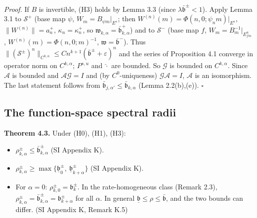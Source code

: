 \documentclass[11pt,a4paper]{article}
\theoremstyle{plain}
\theoremstyle{definition}
\theoremstyle{remark}
\numberwithin{equation}{section}
\numberwithin{figure}{section}
\begin{document}
\textit{Proof.} If $B$ is invertible, (H3) holds by Lemma 3.3 (since $\lambda\bar{\mathfrak b}^\pm<1$). Apply Lemma 3.1 to $\mathcal S^+$ (base map $\psi$, $W_m=B_{\psi m}|_{E^s}$; then $W^{(n)}(m)=\Phi(n,0;\psi_nm)|_{E^s}$, $\|W^{(n)}\|=a^+_n$, $\kappa_n=\kappa^+_n$, so $\mathfrak w_{k,\alpha}=\bar{\mathfrak b}^+_{k,\alpha}$) and to $\mathcal S^-$ (base map $f$, $W_m=B_m^{-1}|_{E^u_{fm}}$, $W^{(n)}(m)=\Phi(n,0;m)^{-1}$, $\mathfrak w=\bar{\mathfrak b}^-$). Thus $\|(\mathcal S^\pm)^n\|_{C^{k,\alpha}}\le Cn^{k+1}(\bar{\mathfrak b}^\pm+\varepsilon)^n$ and the series of Proposition 4.1 converge in operator norm on $C^{k,\alpha}$; $P^{s,u}$ and $\hat\cdot$ are bounded. So $\mathcal G$ is bounded on $C^{k,\alpha}$. Since $\mathcal A$ is bounded and $\mathcal A\mathcal G=I$ and (by $C^0$-uniqueness) $\mathcal G\mathcal A=I$, $\mathcal A$ is an isomorphism. The last statement follows from $\bar{\mathfrak b}_{j,\alpha'}\le\bar{\mathfrak b}_{k,\alpha}$ (Lemma 2.2(b),(e)). $\square$

\subsection{The function-space spectral radii}

\textbf{Theorem 4.3.} Under (H0), (H1), (H3):
\begin{itemize}
    \item[(a)] $\rho^\pm_{k,\alpha}\le\bar{\mathfrak b}^\pm_{k,\alpha}$ (SI Appendix K).
    \item[(b)] $\rho^\pm_{k,\alpha}\ge\max\{\underline{\mathfrak b}^\pm_0,\ \underline{\mathfrak b}^\pm_{k+\alpha}\}$ (SI Appendix K).
    \item[(c)] For $\alpha=0$: $\rho^\pm_{k,0}=\mathfrak b^\pm_k$. In the rate-homogeneous class (Remark 2.3), $\rho^\pm_{k,\alpha}=\bar{\mathfrak b}^\pm_{k,\alpha}=\mathfrak b^\pm_{k+\alpha}$ for all $\alpha$. In general $\underline{\mathfrak b}\le\rho\le\bar{\mathfrak b}$, and the two bounds can differ. (SI Appendix K, Remark K.5)
\end{itemize}
\end{document}
